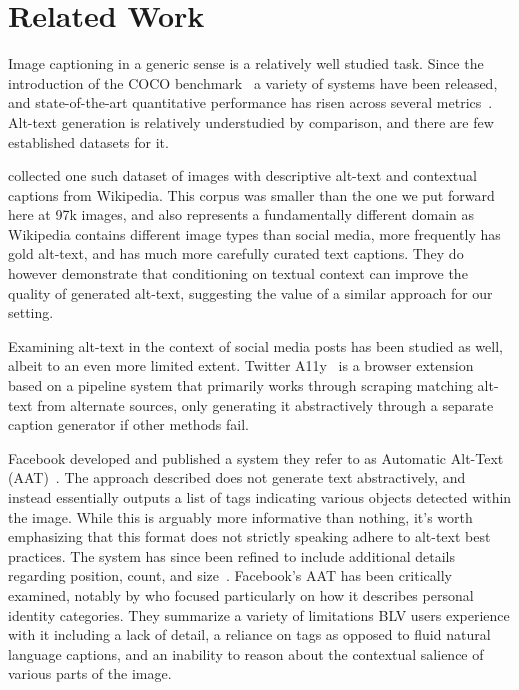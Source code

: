 \documentclass{article} %
\begin{document}
\section{Related Work}

Image captioning in a generic sense is a relatively well studied task.
Since the introduction of the COCO benchmark~\citep{coco} a variety of systems have been released, and state-of-the-art quantitative performance has risen across several metrics~\citep{vinyals2015show,fang2015captions,bernardi2016automatic}.
Alt-text generation is relatively understudied by comparison, and there are few established datasets for it.

\citet{concadia} collected one such dataset of images with descriptive alt-text and contextual captions from Wikipedia.
This corpus was smaller than the one we put forward here at 97k images, and also represents a fundamentally different domain as Wikipedia contains different image types than social media, more frequently has gold alt-text, and has much more carefully curated text captions.
They do however demonstrate that conditioning on textual context can improve the quality of generated alt-text, suggesting the value of a similar approach for our setting.

Examining alt-text in the context of social media posts has been studied as well, albeit to an even more limited extent.
Twitter A11y~\citep{a11y} is a browser extension based on a pipeline system that primarily works through scraping matching alt-text from alternate sources, only generating it abstractively through a separate caption generator if other methods fail.

Facebook developed and published a system they refer to as Automatic Alt-Text (AAT)~\citep{AAT}.
The approach described does not generate text abstractively, and instead essentially outputs a list of tags indicating various objects detected within the image.
While this is arguably more informative than nothing, it's worth emphasizing that this format does not strictly speaking adhere to alt-text best practices.
The system has since been refined to include additional details regarding position, count, and size~\citep{meta_2021}.
Facebook's AAT has been critically examined, notably by \citet{hanley2021} who focused particularly on how it describes personal identity categories.
They summarize a variety of limitations BLV users experience with it including a lack of detail, a reliance on tags as opposed to fluid natural language captions, and an inability to reason about the contextual salience of various parts of the image.
\end{document}
